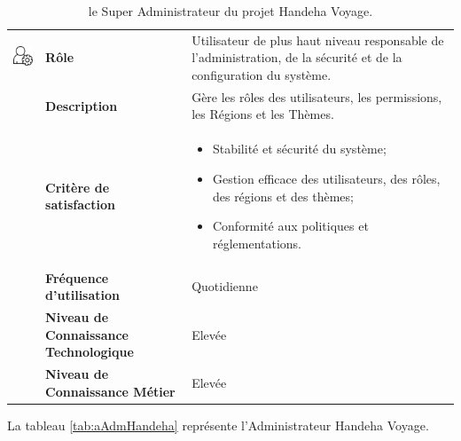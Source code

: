 \documentclass[12pt]{report}
\begin{document}
				\begin{table}[h]
				  \centering
				  \caption{le Super Administrateur du projet Handeha Voyage.}
				  \label{tab:acteurSupAdm}
				    \begin{tabular}{|p{3cm}|p{4cm}|p{7cm}|}
					\hline
					\begin{minipage}{3cm}
						\includegraphics[width=2cm]{supAdm.png}
					\end{minipage} & \textbf{Rôle} & Utilisateur de plus haut niveau responsable de l'administration, de la sécurité et de la configuration du système.\\ \cline{2-3}
							& \textbf{Description} & Gère les rôles des utilisateurs, les permissions, les Régions et les Thèmes. \\ \cline{2-3}
							& \textbf{Critère de satisfaction}& \begin{itemize}
														\item Stabilité et sécurité du système;
														\item Gestion efficace des utilisateurs, des rôles, des régions et des thèmes;
														\item Conformité aux politiques et réglementations.
													\end{itemize}\\ \cline{2-3}
							&\textbf{Fréquence d’utilisation} & Quotidienne \\  \cline{2-3}
							&\textbf{Niveau de Connaissance Technologique} & Elevée \\  \cline{2-3}
							&\textbf{Niveau de Connaissance Métier} & Elevée \\ 
					\hline
				    \end{tabular}
				\end{table}
				\FloatBarrier				

				La tableau \ref{tab:aAdmHandeha} représente l'Administrateur Handeha Voyage.
\end{document}
